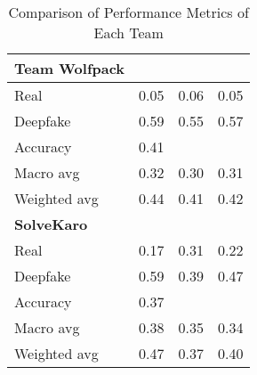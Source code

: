 \begin{table}[h]
\begin{tabular}{|l|c|c|c|}
    \textbf{Team Wolfpack} & & & \\ \hline
    Real & 0.05 & 0.06 & 0.05 \\ 
    Deepfake & 0.59 & 0.55 & 0.57 \\ 
    Accuracy & 0.41 & & \\ 
    Macro avg & 0.32 & 0.30 & 0.31 \\ 
    Weighted avg & 0.44 & 0.41 & 0.42 \\ \hline
    \textbf{SolveKaro} & & & \\ \hline
    Real & 0.17 & 0.31 & 0.22 \\ 
    Deepfake & 0.59 & 0.39 & 0.47 \\ 
    Accuracy & 0.37 & & \\ 
    Macro avg & 0.38 & 0.35 & 0.34 \\ 
    Weighted avg & 0.47 & 0.37 & 0.40 \\ \hline
    \end{tabular}
    \caption{Comparison of Performance Metrics of Each Team}
\end{table}
 

